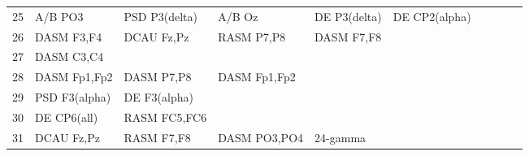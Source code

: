 \begin{landscape}
\begin{table}[]
\begin{tabular}{l|llllllll}
25       & A/B PO3               & PSD P3(delta)         & A/B Oz               & DE P3(delta)            & DE CP2(alpha)           &                      &                      &                       &                       &                    \\
26       & DASM F3,F4            & DCAU Fz,Pz            & RASM P7,P8           & DASM F7,F8              &                         &                      &                      &                       &                       &                    \\
27       & DASM C3,C4            &                       &                      &                         &                         &                      &                      &                       &                       &                    \\
28       & DASM Fp1,Fp2          & DASM P7,P8            & DASM Fp1,Fp2         &                         &                         &                      &                      &                       &                       &                    \\
29       & PSD F3(alpha)         & DE F3(alpha)          &                      &                         &                         &                      &                      &                       &                       &                    \\
30       & DE CP6(all)           & RASM FC5,FC6          &                      &                         &                         &                      &                      &                       &                       &                    \\
31       & DCAU Fz,Pz            & RASM F7,F8            & DASM PO3,PO4         & 24-gamma                &                         &                      &                      &                       &                       &                    \\
\end{tabular}
\end{table}
\end{landscape}
\clearpage
